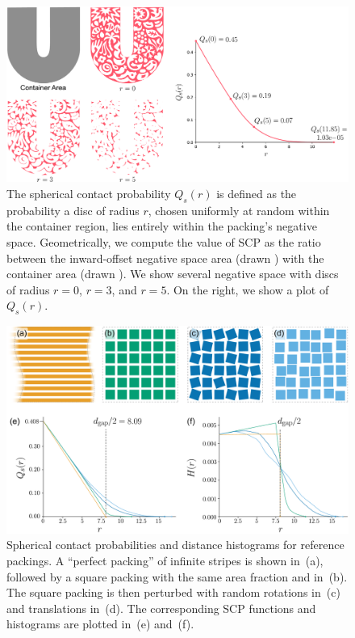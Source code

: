 \begin{figure}[t]
\centering
\includegraphics[width=1.0\textwidth]{figures/metrics/unilever_scp.pdf}
\caption[An illustration of calculating $Q_s(r)$]
{\label{fig_unilever_scp}
\newtext
{
    The spherical contact probability $Q_s(r)$ is defined as the probability 
    a disc of radius $r$, chosen uniformly at random within the container region, lies entirely within the 
	packing's negative space.
	Geometrically, we compute the value of SCP as the ratio between the inward-offset negative space area (drawn )
	with the container area (drawn ).
	We show several  negative space with discs of radius $r = 0$, $r = 3$, and $r = 5$.
	On the right, we show a plot of $Q_s(r)$.
}
}
\end{figure}

\begin{figure}[h]
\centering
\includegraphics[width=1.0\textwidth]{figures/metrics/hsr_viz_big.pdf}
\caption[Spherical contact probabilities and distance histograms \newline for reference packings]
{\label{hsr_viz}
Spherical contact probabilities and distance histograms for 
reference packings.
A ``perfect packing'' of infinite stripes is shown in~(a),
followed by a square packing with the same area fraction and 
in~(b).  The square packing is then perturbed with random rotations in~(c)
and translations in~(d). The corresponding SCP functions and histograms are plotted
in~(e) and~(f).}
\end{figure}


